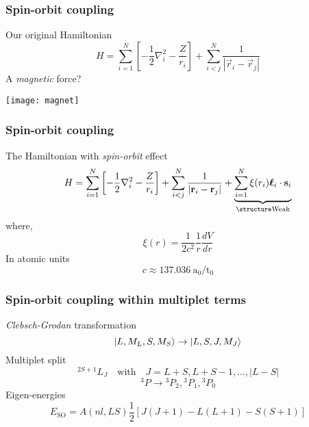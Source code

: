 \begin{frame}[t]
  \frametitle{Spin-orbit coupling}
  \small
  Our original Hamiltonian
  \[
  H = \sum_{i=1}^N \left[ -\frac{1}{2} \nabla_i^2 - \frac{Z}{r_i} \right] + \sum_{i<j}^N \frac{1}{|\vec{r}_i - \vec{r}_j|}
  \] \pause
  A \emph{magnetic} force?
  \vspace{-1em}
  \begin{center}
  \texttt{[image: magnet]}
  \end{center}
\end{frame}

\begin{frame}[t]
  \frametitle{Spin-orbit coupling}
  \small
  The Hamiltonian with \emph{spin-orbit} effect
  \[
  H = \sum_{i=1}^N \left[ -\frac{1}{2} \nabla_i^2 - \frac{Z}{r_i} \right] + \sum_{i<j}^N \frac{1}{|\vec{r}_i - \vec{r}_j|} + \underbrace{\sum_{i=1}^N \xi(r_i) \boldsymbol{\ell}_i\cdot\vec{s}_i}_{\emph{\text{Weak}}}
  \]
  where,
  \[ \xi(r) = \frac{1}{2c^2} \frac{1}{r} \frac{dV}{dr} \]
  In atomic units
  \[ c \approx 137.036\ \mathrm{a_0/t_0} \]
\end{frame}

\begin{frame}[t]
  \frametitle{Spin-orbit coupling within multiplet terms}
  \small
  \emph{Clebsch-Grodan} transformation
  \[ \Ket{L,M_L,S,M_S} \rightarrow \Ket{L,S,J,M_J} \]
  Multiplet split
  \[ ^{2S+1}L_J \quad \text{with} \quad J=L+S,L+S-1,\ldots,|L-S| \]
  \[ ^3P \rightarrow {^3P_2},{^3P_1},{^3P_0} \]
  Eigen-energies
  \[\boxed{
  E_\text{SO} = A(nl,LS) \frac{1}{2}[J(J+1)-L(L+1)-S(S+1)]
  }\]
\end{frame}

